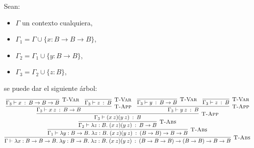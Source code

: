 \documentclass[a4paper]{report}
\begin{document}
Sean:
\begin{itemize}
\item $\Gamma$ un contexto cualquiera,
\item $\Gamma_{1} = \Gamma \cup \{ x:B\rightarrow B\rightarrow B\}$,
\item $\Gamma_{2} = \Gamma_{1} \cup \{ y:B\rightarrow B\}$,
\item $\Gamma_{3} = \Gamma_{2} \cup \{ z:B\}$,
\end{itemize}
se puede dar el siguiente \'arbol:
$$ \infer[\textsc{T-Abs}]
        {\Gamma \vdash \lambda x:B\rightarrow B\rightarrow B.\;
         \lambda y:B\rightarrow B.\;\lambda z:B.\; (x\: z)(y\:z)\: :\:
         (B\rightarrow B\rightarrow B)\rightarrow (B\rightarrow B)
         \rightarrow B \rightarrow B}
        {\infer[\textsc{T-Abs}]
              {\Gamma_{1} \vdash \lambda y:B\rightarrow B.\; \lambda z:B
               .\; (x\: z)(y\: z)\: :\: (B\rightarrow B) \rightarrow B
               \rightarrow B}
              {\infer[\textsc{T-Abs}]
                    {\Gamma_{2} \vdash \lambda z:B.\; (x\: z)(y\: z)\:
                     :\: B\rightarrow B}
                    {\infer[\textsc{T-App}]
                          {\Gamma_{3} \vdash (x\: z)(y\: z)\: :\: B}
                          {\infer[\textsc{T-App}]
                                {\Gamma_{3} \vdash x\: z\: :\:
                                 B\rightarrow B}
                                {\infer[\textsc{T-Var}]
                                      {\Gamma_{3} \vdash x\: :\:
                                       B\rightarrow B\rightarrow B}{}
                                 & \infer[\textsc{T-Var}]
                                      {\Gamma_{3} \vdash z\: :\: B}{}}
                           & \infer[\textsc{T-App}]
                                {\Gamma_{3} \vdash y\: z\: :\: B}
                                {\infer[\textsc{T-Var}]
                                      {\Gamma_{3} \vdash y\: :\:
                                       B \rightarrow B}{}
                                 & \infer[\textsc{T-Var}]
                                      {\Gamma_{3} \vdash z\: :\: B}{}}
                           }
                    }
              }
        } $$
\end{document}
